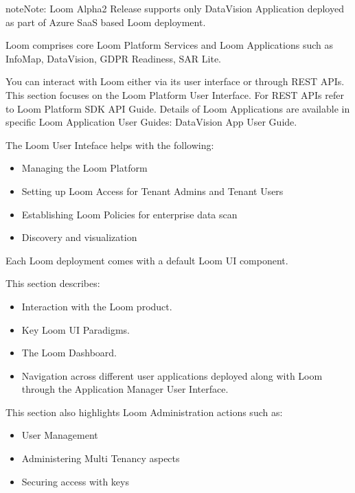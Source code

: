 \documentclass[letterpaper,10pt,english]{sphinxmanual}
\begin{document}
\begin{sphinxadmonition}{note}{Note:}
Loom Alpha2 Release supports only DataVision Application deployed as part of Azure SaaS based Loom deployment.
\end{sphinxadmonition}

Loom comprises core Loom Platform Services and Loom Applications such as InfoMap, DataVision, GDPR Readiness, SAR Lite.

You can interact with Loom either via its user interface or through REST APIs.  This section focuses on the Loom Platform User Interface. For REST APIs refer to Loom Platform SDK API Guide.  Details of Loom Applications are available in specific Loom Application User Guides: DataVision App User Guide.

The Loom User Inteface helps with the following:
\begin{itemize}
\item {} 
Managing the Loom Platform

\item {} 
Setting up Loom Access for Tenant Admins and Tenant Users

\item {} 
Establishing Loom Policies for enterprise data scan

\item {} 
Discovery and visualization

\end{itemize}

Each Loom deployment comes with a default Loom UI component.

This section describes:
\begin{itemize}
\item {} 
Interaction with the Loom product.

\item {} 
Key Loom UI Paradigms.

\item {} 
The Loom Dashboard.

\item {} 
Navigation across different user applications deployed along with Loom through the Application Manager User Interface.

\end{itemize}

This section also highlights Loom Administration actions such as:
\begin{itemize}
\item {} 
User Management

\item {} 
Administering Multi Tenancy aspects

\item {} 
Securing access with keys

\end{itemize}
\end{document}
